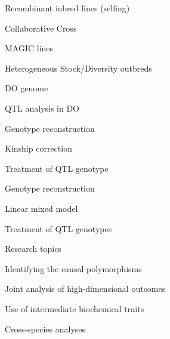 \documentclass[aspectratio=169,12pt,t]{beamer}
\begin{document}
\begin{frame}[c]{Recombinant inbred lines (selfing)}
\end{frame}

\begin{frame}[c]{Collaborative Cross}
\end{frame}

\begin{frame}[c]{MAGIC lines}
\end{frame}

\begin{frame}[c]{Heterogeneous Stock/Diversity outbreds}
\end{frame}

\begin{frame}[c]{DO genome}
\end{frame}


\begin{frame}{QTL analysis in DO}

  \bbi
\item Genotype reconstruction
\item Kinship correction
\item Treatment of QTL genotype
  \ei

\end{frame}




\begin{frame}{Genotype reconstruction}

\end{frame}



\begin{frame}{Linear mixed model}

\end{frame}



\begin{frame}{Treatment of QTL genotypes}

\end{frame}



\begin{frame}{Research topics}

  \bbi
\item Identifying the causal polymorphisms
\item Joint analysis of high-dimensional outcomes
\item Use of intermediate biochemical traits
\item Cross-species analyses
  \ei

\end{frame}
\end{document}
